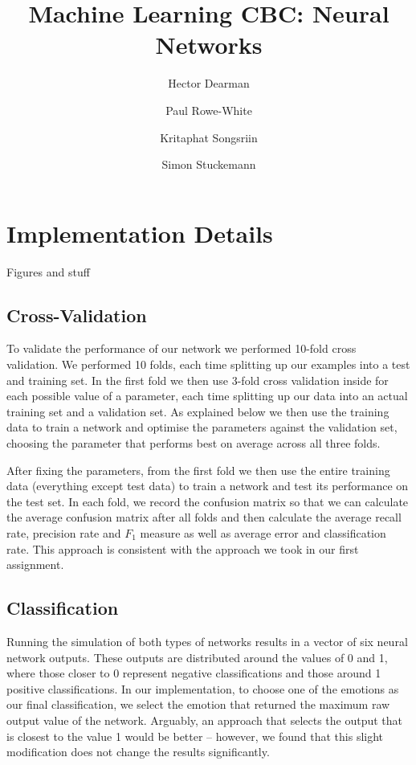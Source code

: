 \documentclass[10pt,a4paper]{article}
\author{Hector Dearman \and Paul Rowe-White \and Kritaphat Songsriin \and Simon Stuckemann}
\title{Machine Learning CBC: Neural Networks}
\begin{document}
\maketitle

\section{Implementation Details}
Figures and stuff
\subsection{Cross-Validation}


To validate the performance of our network we performed 10-fold cross validation. We performed 10 folds, each time splitting up our examples into a test and training set. In the first fold we then use 3-fold cross validation inside for each possible value of a parameter, each time splitting up our data into an actual training set and a validation set. As explained below we then use the training data to train a network and optimise the parameters against the validation set, choosing the parameter that performs best on average across all three folds. 

After fixing the parameters, from the first fold we then use the entire training data (everything except test data) to train a network and test its performance on the test set. In each fold, we record the confusion matrix so that we can calculate the average confusion matrix after all folds and then calculate the average recall rate, precision rate and $F_1$ measure as well as average error and classification rate. This approach is consistent with the approach we took in our first assignment.

\subsection{Classification}
Running the simulation of both types of networks results in a vector of six neural network outputs. These outputs are distributed around the values of 0 and 1, where those closer to 0 represent negative classifications and those around 1 positive classifications. In our implementation, to choose one of the emotions as our final classification, we select the emotion that returned the maximum raw output value of the network. Arguably, an approach that selects the output that is closest to the value 1 would be better -- however, we found that this slight modification does not change the results significantly.
\end{document}
